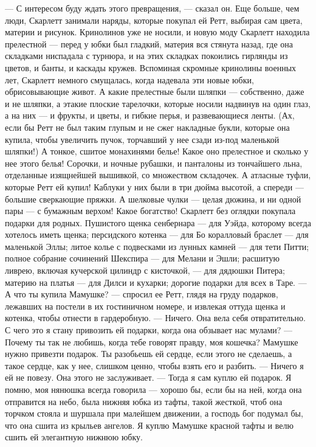 — С интересом буду ждать этого превращения, — сказал он. Еще больше, чем люди, Скарлетт занимали наряды, которые покупал ей Ретт, выбирая сам цвета, материи и рисунок. Кринолинов уже не носили, и новую моду Скарлетт находила прелестной — перед у юбки был гладкий, материя вся стянута назад, где она складками ниспадала с турнюра, и на этих складках покоились гирлянды из цветов, и банты, и каскады кружев. Вспоминая скромные кринолины военных лет, Скарлетт немного смущалась, когда надевала эти новые юбки, обрисовывающие живот. А какие прелестные были шляпки — собственно, даже и не шляпки, а этакие плоские тарелочки, которые носили надвинув на один глаз, а на них — и фрукты, и цветы, и гибкие перья, и развевающиеся ленты. (Ах, если бы Ретт не был таким глупым и не сжег накладные букли, которые она купила, чтобы увеличить пучок, торчавший у нее сзади из-под маленькой шляпки!) А тонкое, сшитое монахинями белье! Какое оно прелестное и сколько у нее этого белья! Сорочки, и ночные рубашки, и панталоны из тончайшего льна, отделанные изящнейшей вышивкой, со множеством складочек. А атласные туфли, которые Ретт ей купил! Каблуки у них были в три дюйма высотой, а спереди — большие сверкающие пряжки. А шелковые чулки — целая дюжина, и ни одной пары — с бумажным верхом! Какое богатство!
Скарлетт без оглядки покупала подарки для родных. Пушистого щенка сенбернара — для Уэйда, которому всегда хотелось иметь щенка; персидского котенка — для Бо коралловый браслет — для маленькой Эллы; литое колье с подвесками из лунных камней — для тети Питти; полное собрание сочинений Шекспира — для Мелани и Эшли; расшитую ливрею, включая кучерской цилиндр с кисточкой, — для дядюшки Питера; материю на платья — для Дилси и кухарки; дорогие подарки для всех в Таре.
— А что ты купила Мамушке? — спросил ее Ретт, глядя на груду подарков, лежавших на постели в их гостиничном номере, и извлекая оттуда щенка и котенка, чтобы отнести в гардеробную.
— Ничего. Она вела себя отвратительно. С чего это я стану привозить ей подарки, когда она обзывает нас мулами?
— Почему ты так не любишь, когда тебе говорят правду, моя кошечка? Мамушке нужно привезти подарок. Ты разобьешь ей сердце, если этого не сделаешь, а такое сердце, как у нее, слишком ценно, чтобы взять его и разбить.
— Ничего я ей не повезу. Она этого не заслуживает.
— Тогда я сам куплю ей подарок. Я помню, моя нянюшка всегда говорила — хорошо бы, если бы на ней, когда она отправится на небо, была нижняя юбка из тафты, такой жесткой, чтоб она торчком стояла и шуршала при малейшем движении, а господь бог подумал бы, что она сшита из крыльев ангелов. Я куплю Мамушке красной тафты и велю сшить ей элегантную нижнюю юбку.
